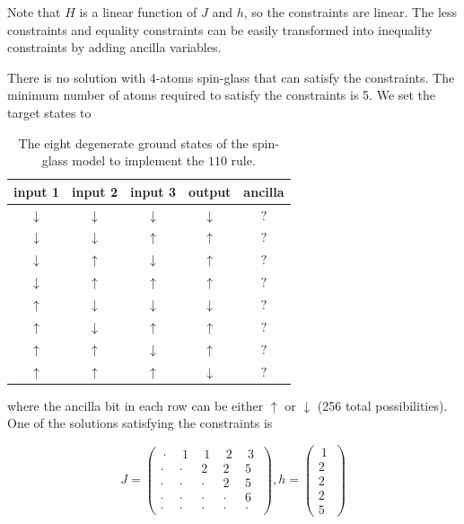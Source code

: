 \documentclass[twocolumn,superscriptaddress,english,showpacs,longbibliography]{revtex4-2}
\begin{document}
Note that $H$ is a linear function of $J$ and $h$, so the
constraints are linear. The less constraints and equality constraints
can be easily transformed into inequality constraints by adding ancilla
variables.

There is no solution with 4-atoms spin-glass that can satisfy the
constraints. The minimum number of atoms required to satisfy the
constraints is 5. We set the target states to

\begin{table}[H]
    \centering
\begin{tabular}{|c|c|c|c|c|}
\hline
input 1 & input 2 & input 3 & output & ancilla \\
\hline
$\downarrow$ & $\downarrow$ & $\downarrow$ & $\downarrow$ & $?$ \\
$\downarrow$ & $\downarrow$ & $\uparrow$ & $\uparrow$ & $?$ \\
$\downarrow$ & $\uparrow$ & $\downarrow$ & $\uparrow$ & $?$ \\
$\downarrow$ & $\uparrow$ & $\uparrow$ & $\uparrow$ & $?$ \\
$\uparrow$ & $\downarrow$ & $\downarrow$ & $\downarrow$ & $?$ \\
$\uparrow$ & $\downarrow$ & $\uparrow$ & $\uparrow$ & $?$ \\
$\uparrow$ & $\uparrow$ & $\downarrow$ & $\uparrow$ & $?$ \\
$\uparrow$ & $\uparrow$ & $\uparrow$ & $\downarrow$ & $?$ \\
\hline
\end{tabular}
\caption{The eight degenerate ground states of the spin-glass model to implement the $110$ rule.}
\end{table}

where the ancilla bit in each row can be either $\uparrow$ or
$\downarrow$ (256 total possibilities). One of the solutions
satisfying the constraints is

\begin{equation}
J = \begin{pmatrix}
~\cdot~ & ~1~ & ~1~ & ~2~ & ~3~\\
\cdot & \cdot & 2 & 2 & 5\\
\cdot & \cdot & \cdot & 2 & 5\\
\cdot & \cdot & \cdot & \cdot & 6\\
\cdot & \cdot & \cdot & \cdot & \cdot
\end{pmatrix}, h = \begin{pmatrix}
~1~\\
2\\
2\\
2\\
5
\end{pmatrix}
\end{equation}
\end{document}

